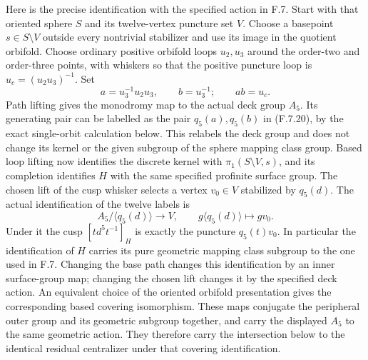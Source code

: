Here is the precise identification with the specified
action in F.7.  Start with that oriented sphere $S$
and its twelve-vertex puncture set $V$.  Choose a
basepoint $s\in S\setminus V$ outside every nontrivial
stabilizer and use its image in the quotient orbifold.
Choose ordinary positive orbifold loops $u_2,u_3$
around the order-two and order-three points, with
whiskers so that the positive puncture loop is
$u_c=(u_2u_3)^{-1}$.  Set
\[
             a=u_3^{-1}u_2u_3,\qquad b=u_3^{-1};
                   \qquad ab=u_c.
\]
Path lifting gives the monodromy map to the actual
deck group $A_5$.  Its generating pair can be labelled
as the pair $q_5(a),q_5(b)$ in (F.7.20), by the exact
single-orbit calculation below.  This relabels the
deck group and does not change its kernel or the
given subgroup of the sphere mapping class group.
Based loop lifting now identifies the discrete
kernel with $\pi_1(S\setminus V,s)$, and its completion
identifies $H$ with the same specified profinite
surface group.  The chosen lift of the cusp whisker
selects a vertex $v_0\in V$ stabilized by $q_5(d)$.
The actual identification of the twelve labels is
\[
        A_5/\langle q_5(d)\rangle\longrightarrow V,
                   \qquad g\langle q_5(d)\rangle
                                    \longmapsto g v_0.
\]
Under it the cusp $[t d^5t^{-1}]_H$ is exactly the
puncture $q_5(t)v_0$.  In particular the identification
of $H$ carries its pure geometric mapping class
subgroup to the one used in F.7.
Changing the base path changes this identification
by an inner surface-group map; changing the chosen
lift changes it by the specified deck action.
An equivalent choice of the oriented orbifold
presentation gives the corresponding based covering
isomorphism.  These maps conjugate the peripheral
outer group and its geometric subgroup together,
and carry the displayed $A_5$ to the same geometric
action.  They therefore carry the intersection
below to the identical residual centralizer under
that covering identification.

